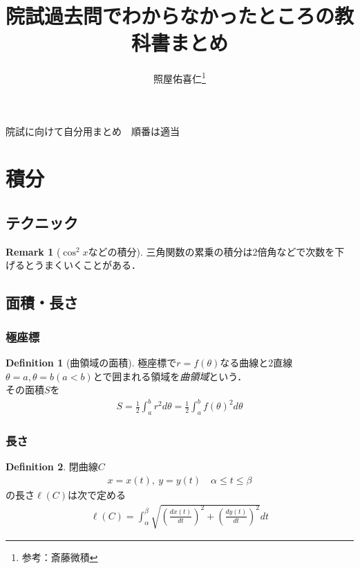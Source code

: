\documentclass[a4j,uplatex]{jsarticle}
\title{院試過去問でわからなかったところの教科書まとめ}
\author{照屋佑喜仁\thanks{参考：斎藤微積}}
\theoremstyle{definition}
\newtheorem*{df*}{Definition}
\newtheorem{rem}[dfn]{Remark}
\begin{document}
\maketitle
院試に向けて自分用まとめ　順番は適当
\tableofcontents

\section{積分}
\subsection{テクニック}
\begin{rem}[$\cos^2x$などの積分]
    三角関数の累乗の積分は2倍角などで次数を下げるとうまくいくことがある．
\end{rem}
\subsection{面積・長さ}
\subsubsection{極座標}
\begin{df*}[曲領域の面積]
    極座標で$r=f(\theta)$なる曲線と2直線$\theta=a,\theta=b(a<b)$とで囲まれる領域を\emph{曲領域}という．\\
    その面積$S$を
    \begin{align*}
        S=\frac{1}{2}\int_{a}^{b}r^2d\theta=\frac{1}{2}\int_{a}^{b}f(\theta)^2d\theta
    \end{align*}
\end{df*}

\subsubsection{長さ}
\begin{df*}
    閉曲線$C$
    \begin{align*}
        x=x(t),\: y=y(t) \quad \alpha \leq t \leq \beta
    \end{align*}
    の長さ$\ell(C)$は次で定める
    \begin{align*}
        \ell(C)=\int_{\alpha}^{\beta}\sqrt{\left(\frac{dx(t)}{dt}\right)^2+\left(\frac{dy(t)}{dt}\right)^2}dt
    \end{align*}
\end{df*}
\end{document}
